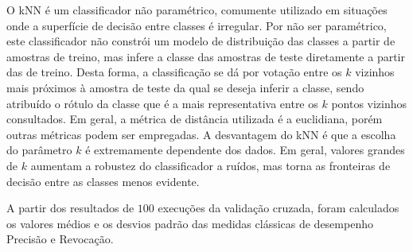O \ac{kNN} é um classificador não paramétrico, comumente utilizado em situações onde a superfície de decisão entre classes é irregular. Por não ser paramétrico, este classificador não constrói um modelo de distribuição das classes a partir de amostras de treino, mas infere a classe das amostras de teste diretamente a partir das de treino. Desta forma, a classificação se dá por votação entre os $k$ vizinhos mais próximos à amostra de teste da qual se deseja inferir a classe, sendo atribuído o rótulo da classe que é a mais representativa entre os $k$ pontos vizinhos consultados. Em geral, a métrica de distância utilizada é a euclidiana, porém outras métricas podem ser empregadas. A desvantagem do \ac{kNN} é que a escolha do parâmetro $k$ é extremamente dependente dos dados. Em geral, valores grandes de $k$ aumentam a robustez do classificador a ruídos, mas torna as fronteiras de decisão entre as classes menos evidente.

A partir dos resultados de $100$ execuções da validação cruzada, foram calculados os valores médios e os desvios padrão das medidas clássicas de desempenho Precisão e Revocação.








